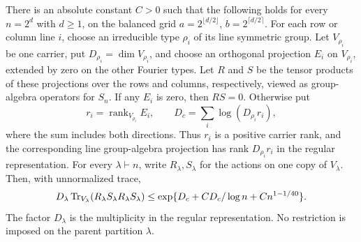 \begin{lemma}\label{rec:biased-grid-fourth}
There is an absolute constant $C>0$ such that the following holds
for every $n=2^d$ with $d\ge1$, on the balanced grid
$a=2^{\lfloor d/2\rfloor}$, $b=2^{\lceil d/2\rceil}$.
For each row or column line $i$, choose an irreducible type $\rho_i$
of its line symmetric group. Let $V_{\rho_i}$ be one carrier, put
$D_{\rho_i}=\dim V_{\rho_i}$, and choose an orthogonal projection
$E_i$ on $V_{\rho_i}$, extended by zero on the other Fourier types.
Let $R$ and $S$ be the tensor products of these projections over
the rows and columns, respectively, viewed as group-algebra operators
for $S_n$. If any $E_i$ is zero, then $RS=0$. Otherwise put
\[
 r_i=\operatorname{rank}_{V_{\rho_i}}E_i,\qquad
 D_c=\sum_i\log(D_{\rho_i}r_i),
\]
where the sum includes both directions. Thus $r_i$ is a positive
carrier rank, and the corresponding line group-algebra projection
has rank $D_{\rho_i}r_i$ in the regular representation.
For every $\lambda\vdash n$, write $R_\lambda,S_\lambda$ for the
actions on one copy of $V_\lambda$. Then, with unnormalized trace,
\[
 D_\lambda\operatorname{Tr}_{V_\lambda}
   (R_\lambda S_\lambda R_\lambda S_\lambda)
 \le\exp\{D_c+C D_c/\log n+C n^{1-1/40}\}.
\]
The factor $D_\lambda$ is the multiplicity in the regular
representation. No restriction is imposed on the parent partition
$\lambda$.
\end{lemma}
